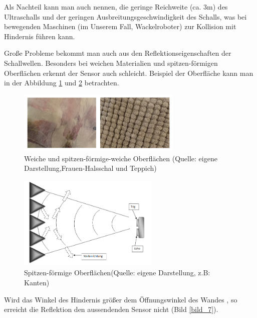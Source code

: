 Als Nachteil kann man auch nennen, die geringe Reichweite (ca. 3m) des Ultraschalls und  der geringen Ausbreitungsgeschwindigkeit des Schalls, was bei  bewegenden Maschinen (im Unserem Fall, Wackelroboter) zur Kollision mit Hindernis führen kann.

Große Probleme bekommt man auch aus den Reflektionseigenschaften der Schallwellen. Besonders bei weichen Materialien und spitzen-förmigen Oberflächen erkennt  der Sensor auch schleicht. Beispiel der Oberfläche kann man in der Abbildung \ref{bild_4} und \ref{bild_6} betrachten.

\begin{figure}[!h]  %
	\centering\includegraphics[width=0.7\textwidth]{images/Bild-4-5.png}
	\caption{Weiche und spitzen-förmige-weiche Oberflächen \newline(Quelle: eigene Darstellung,Frauen-Halsschal und Teppich)}
	\label{bild_4}
\end{figure}
\begin{figure}[!h]  %
	\centering\includegraphics[width=0.6\textwidth]{images/Bild-6.png}
	\caption{Spitzen-förmige Oberflächen\newline(Quelle: eigene Darstellung, z.B: Kanten)}
	\label{bild_6}
\end{figure}

Wird das Winkel des Hindernis größer dem Öffnungswinkel des Wandes , so erreicht die Reflektion den aussendenden Sensor nicht (Bild \ref{bild_7}). 

